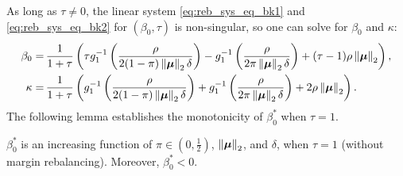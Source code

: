 As long as $\tau \not= 0$, the linear system \cref{eq:reb_sys_eq_bk1} and \eqref{eq:reb_sys_eq_bk2} for $(\beta_0, \tau)$ is non-singular, so one can solve for $\beta_0$ and $\kappa$:
\begin{subequations}
\begin{align}
	\label{eq:beta0_tau}
	\beta_0 = \, & \frac{1}{1 + \tau} \left( \tau g_1^{-1} \left( \frac{\rho}{2 (1 - \pi) \left\|{\text{\boldmath $\mu$}}\right\|_2 \delta} \right) - g_1^{-1} \left( \frac{\rho}{2 \pi \left\|{\text{\boldmath $\mu$}}\right\|_2 \delta} \right) + (\tau - 1) \rho \left\|{\text{\boldmath $\mu$}}\right\|_2 \right), \\
	\label{eq:kappa_tau}
	\kappa = \, & \frac{1}{1 + \tau} \left( g_1^{-1} \left( \frac{\rho}{2 (1 - \pi) \left\|{\text{\boldmath $\mu$}}\right\|_2 \delta} \right) + g_1^{-1} \left( \frac{\rho}{2 \pi \left\|{\text{\boldmath $\mu$}}\right\|_2 \delta} \right) + 2 \rho \left\|{\text{\boldmath $\mu$}}\right\|_2 \right).
\end{align}
\end{subequations}
The following lemma establishes the monotonicity of $\beta_0^*$ when $\tau = 1$. 
\begin{lem}\label{lem:beta0_mono}
    $\beta_0^*$ is an increasing function of $\pi \in (0, \frac12)$, $\left\|{\text{\boldmath $\mu$}}\right\|_2$, and $\delta$, when $\tau = 1$ (without margin rebalancing). Moreover, $\beta_0^* < 0$.
\end{lem}
